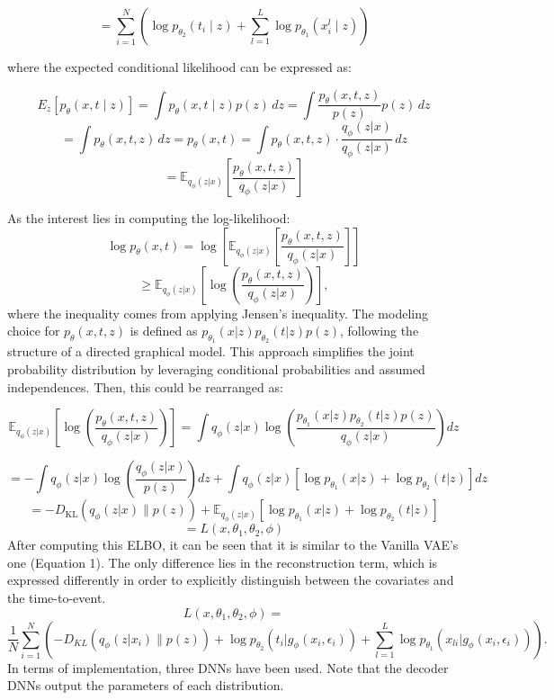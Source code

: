 \documentclass{article}
\begin{document}
\begin{equation}
= \sum_{i=1}^N \left(\log p_{\theta_2}(t_i \mid z) + \sum_{l=1}^L \log p_{\theta_1}(x_i^l \mid z)\right) 
\end{equation}

where the expected conditional likelihood can be expressed as:

\[
E_z \left[ p_\theta (x, t \mid z) \right] = \int p_\theta (x, t \mid z) p(z) \, dz = \int \frac{p_\theta(x,t,z)}{p(z)} p(z) \, dz
\]
\begin{equation}
=\int p_\theta(x,t,z) \, dz = p_\theta(x,t) = \int p_\theta(x,t,z) \cdot \frac{q_\phi(z|x)}{q_\phi(z|x)} \, dz 
\end{equation}
\[
= \mathbb{E}_{q_\phi(z|x)} \left[ \frac{p_\theta(x,t,z)}{q_\phi(z|x)} \right]
\]

As the interest lies in computing the log-likelihood:
\begin{equation}
\log p_\theta(x, t) = \log \left[ \mathbb{E}_{q_\phi(z|x)} \left[ \frac{p_\theta(x,t,z)}{q_\phi(z|x)} \right] \right]
\end{equation}
\[
 \geq \mathbb{E}_{q_\phi(z|x)} \left[ \log \left( \frac{p_\theta(x,t,z)}{q_\phi(z|x)} \right) \right],
\]
where the inequality comes from applying Jensen’s inequality.
The modeling choice for \( p_\theta(x, t, z) \) is defined as \( p_{\theta_1}(x|z) p_{\theta_2}(t|z) p(z) \), following the structure of a directed graphical model. This approach simplifies the joint probability distribution by leveraging conditional probabilities and assumed independences. Then, this could be rearranged as:

\[
\mathbb{E}_{q_\phi(z|x)} \left[ \log \left( \frac{p_\theta(x, t, z)}{q_\phi(z|x)} \right) \right] = \int q_\phi(z|x) \log \left( \frac{p_{\theta_1}(x|z) p_{\theta_2}(t|z) p(z)}{q_\phi(z|x)} \right) dz
\]

\[
= -\int q_\phi(z|x) \log \left( \frac{q_\phi(z|x)}{p(z)} \right) dz + \int q_\phi(z|x) \left[ \log p_{\theta_1}(x|z) + \log p_{\theta_2}(t|z) \right] dz
\]
\begin{equation}
= -D_{\text{KL}}(q_\phi(z|x) \parallel p(z)) + \mathbb{E}_{q_\phi(z|x)} \left[ \log p_{\theta_1}(x|z) + \log p_{\theta_2}(t|z) \right]
\end{equation}
\[
= L(x, \theta_1, \theta_2, \phi)
\]
After computing this ELBO, it can be seen that it is similar to the Vanilla VAE’s one (Equation 1). The only difference lies in the reconstruction term, which is expressed differently in order to explicitly distinguish between the covariates and the time-to-event.
\[
L(x, \theta_1, \theta_2, \phi)=
\]
\begin{equation}
\frac{1}{N} \sum_{i=1}^N \left( -D_{KL}(q_\phi(z|x_i) \parallel p(z)) + \log p_{\theta_2}(t_i|g_\phi(x_i, \epsilon_i)) + \sum_{l=1}^L \log p_{\theta_1}(x_{li}|g_\phi(x_i, \epsilon_i)) \right).
\end{equation}
In terms of implementation, three DNNs have been used. Note that the decoder DNNs output the parameters of each distribution.
\end{document}
